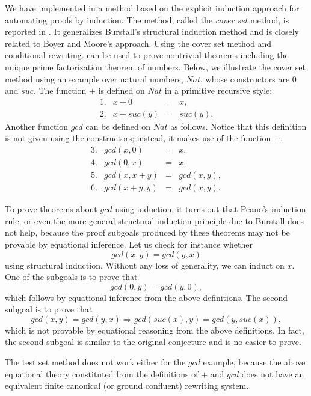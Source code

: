 We have implemented in \RRL a method based on the explicit
induction approach for automating proofs by induction. The method,
called the {\sl cover set} method, is reported in \cite{ZKM88,Zhang88}. 
It generalizes Burstall's structural induction method
and is closely related to Boyer and Moore's approach. Using the
cover set method and conditional
rewriting.
\RRL can be used to prove nontrivial 
theorems including the unique prime factorization theorem of numbers.
Below, we illustrate the cover set method using an example over
natural numbers, ${Nat}$, whose constructors are $0$ and ${suc}$. The
function $+$ is defined on ${Nat}$ in a primitive recursive style:
\[\begin{array}{rlcl}
 1. & x + 0 & = & x, \\
 2. & x + suc(y) & = & suc(y).
\end{array}\]
Another function $gcd$ can be defined on ${Nat}$ as follows. Notice
that this definition is not given using the constructors; instead, it
makes use of the function $+$.
\[\begin{array}{rlcl}
  3. & gcd(x, 0) & = & x, \\
  4. & gcd(0, x) & = & x, \\
  5. & gcd(x, x + y) & = & gcd(x, y), \\
  6. & gcd(x + y, y) & = & gcd(x, y).
\end{array}\]

To prove theorems about ${gcd}$ using induction, it turns out
that Peano's induction rule, or even the more general structural
induction principle due to Burstall does not help,
because the proof subgoals produced by these theorems may not be
provable by equational inference. Let us check for instance whether
  \[gcd(x, y) = gcd(y, x)\]
using structural induction. Without any loss of generality, we can
induct on $x$.  One of the subgoals is to prove that
  \[ gcd(0, y) = gcd(y, 0), \]
which follows by equational inference from the above definitions. The
second subgoal is to prove that
 \[ gcd(x, y) = gcd(y, x) \Rightarrow
    gcd(suc(x), y) = gcd(y, suc(x)), \]
which is not provable by equational reasoning from the above
definitions. In fact, the second subgoal is similar to the original
conjecture and is no easier to prove.

The test set method does not work either for the $gcd$ example,
because the above equational theory constituted from the definitions
of $+$ and $gcd$ does not have an equivalent finite canonical
(or ground confluent) rewriting system.

